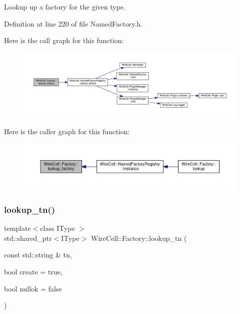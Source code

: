 Lookup up a factory for the given type. 



Definition at line 220 of file Named\+Factory.\+h.

Here is the call graph for this function\+:
\nopagebreak
\begin{figure}[H]
\begin{center}
\leavevmode
\includegraphics[width=350pt]{namespace_wire_cell_1_1_factory_a33318e89ff05184cf57267d20bdc076c_cgraph}
\end{center}
\end{figure}
Here is the caller graph for this function\+:
\nopagebreak
\begin{figure}[H]
\begin{center}
\leavevmode
\includegraphics[width=350pt]{namespace_wire_cell_1_1_factory_a33318e89ff05184cf57267d20bdc076c_icgraph}
\end{center}
\end{figure}
\mbox{\label{namespace_wire_cell_1_1_factory_acde6688421b73bf10a0d26e77c9330c2}} 
\subsubsection{\texorpdfstring{lookup\+\_\+tn()}{lookup\_tn()}}
{\footnotesize\ttfamily template$<$class I\+Type $>$ \\
std\+::shared\+\_\+ptr$<$I\+Type$>$ Wire\+Cell\+::\+Factory\+::lookup\+\_\+tn (\begin{DoxyParamCaption}\item[{const std\+::string \&}]{tn,  }\item[{bool}]{create = {\ttfamily true},  }\item[{bool}]{nullok = {\ttfamily false} }\end{DoxyParamCaption})}



